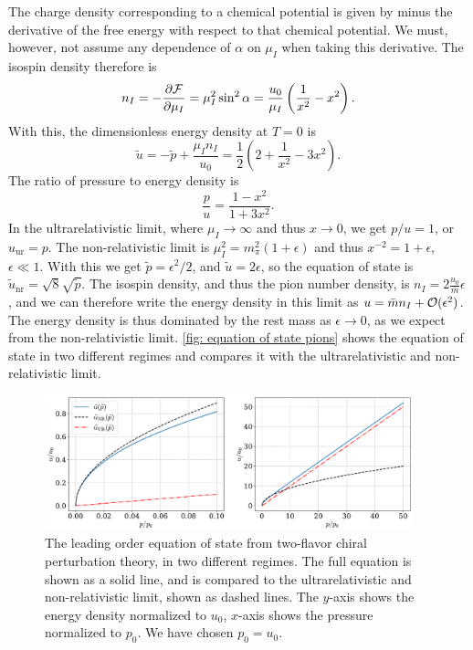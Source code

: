 %
The charge density corresponding to a chemical potential is given by minus the derivative of the free energy with respect to that chemical potential. 
We must, however, not assume any dependence of $\alpha$ on $\mu_I$ when taking this derivative.
The isospin density therefore is
%
\begin{equation}
    n_I = -\pdv{\mathcal{F}}{\mu_I} = \mu_I^2 \sin^2 \alpha 
    = 
    \frac{u_0}{\mu_I} \left(\frac{1}{x^2} - x^2\right).
\end{equation}
%
With this, the dimensionless energy density at $T = 0$ is
%
\begin{equation}
    \label{energy density leading order chpt}
    \tilde u = - \tilde p + \frac{\mu_I n_I}{u_0}
    = \frac{1}{2} \left( 2 + \frac{1}{x^2} - 3 x^2\right).
\end{equation}
% 
The ratio of pressure to energy density is~\autocite{sonQCDFiniteIsospin2001}
%
\begin{equation} 
    \label{pressure energy ratio leading order chpt}
    \frac{p}{u} = \frac{1- x^2}{1+3x^2}.
\end{equation}
%
In the ultrarelativistic limit, where $\mu_I \rightarrow \infty$ and thus $x \rightarrow 0$, we get $p / u = 1$, or $u_\text{ur} = p$.
The non-relativistic limit is $\mu_I^2 = m_\pi^2(1 + \epsilon)$ and thus $x^{-2} = 1 + \epsilon$, $\epsilon \ll 1$.
With this we get $\tilde p = \epsilon^2 / 2 $, and $\tilde u = 2\epsilon$, so the equation of state is $\tilde u_\text{nr} = \sqrt 8 \sqrt{\tilde p}$.
The isospin density, and thus the pion number density, is $n_I = 2 \frac{u_0}{\bar m} \epsilon$, and we can therefore write the energy density in this limit as $u = \bar m n_I + \mathcal O(\epsilon^2)$.
The energy density is thus dominated by the rest mass as $\epsilon \rightarrow 0$, as we expect from the non-relativistic limit.
\autoref{fig: equation of state pions} shows the equation of state in two different regimes and compares it with the ultrarelativistic and non-relativistic limit.

\begin{figure}[h]
    \centering
    \includegraphics[width=0.95\textwidth]{../scripts/figurer/pion_star/pion_eos.pdf}
    \caption{
        The leading order equation of state from two-flavor chiral perturbation theory, in two different regimes.
        The full equation is shown as a solid line, and is compared to the ultrarelativistic and non-relativistic limit, shown as dashed lines. 
        The $y$-axis shows the energy density normalized to $u_0$, $x$-axis shows the pressure normalized to $p_0$.
        We have chosen $p_0 = u_0$.
    }
    \label{fig: equation of state pions}
\end{figure}



